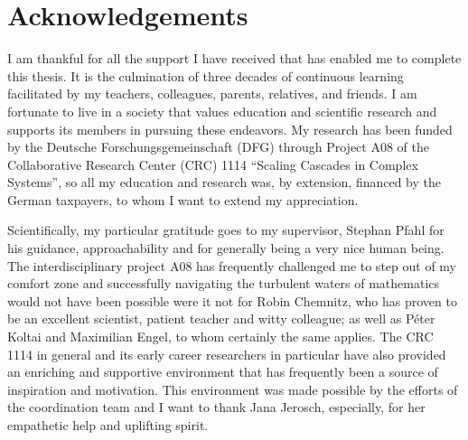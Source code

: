 \begin{appendices}
    \renewcommand{\thesection}{\thechapter.\Alph{section}}
    \renewcommand{\thesubsection}{\thesection.\arabic{subsection}}
\end{appendices}

\chapter*{Acknowledgements}

I am thankful for all the support I have received that has enabled me to
complete this thesis. It is the culmination of three decades of continuous
learning facilitated by my teachers, colleagues, parents, relatives, and friends.
I am fortunate to live in a society that values education and scientific
research
and supports its members in pursuing these endeavors. My research has been
funded by the
Deutsche Forschungsgemeinschaft (DFG) through Project A08 of the
Collaborative Research Center (CRC) 1114
\enquote{Scaling Cascades in Complex Systems}, so all my education and
research was, by extension, financed by the German taxpayers, to whom I
want to extend my appreciation.

\bigskip

Scientifically, my particular gratitude goes to my supervisor, Stephan Pfahl
for his guidance, approachability and for generally being a very nice human
being.
The interdisciplinary project A08 has frequently challenged me to step
out of my comfort zone and successfully navigating the turbulent waters
of mathematics would not have been possible were it not for Robin Chemnitz,
who has
proven to be an excellent scientist, patient teacher and witty colleague;
as well as P\'eter Koltai and Maximilian Engel, to whom certainly the same
applies. The CRC 1114 in general and its early career researchers in
particular have also
provided an enriching and supportive environment that has frequently been
a source of inspiration and motivation. This environment was made possible
by the efforts of the coordination team and I want to thank Jana Jerosch,
especially, for her empathetic help and uplifting spirit.

